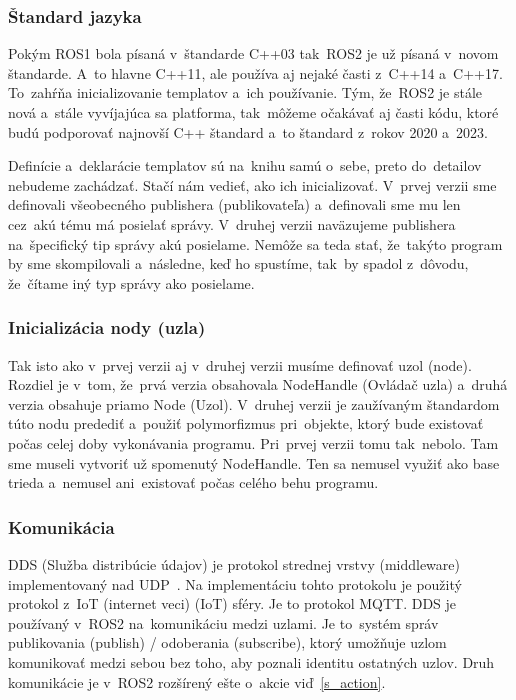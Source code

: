 \subsubsection{Štandard jazyka}

	Pokým ROS1 bola písaná v~štandarde C++03 tak~ROS2 je už písaná v~novom štandarde. A~to hlavne C++11, ale používa aj nejaké časti z~C++14
	a~C++17. To~zahŕňa inicializovanie templatov a~ich používanie. Tým, že~ROS2 je stále nová a~stále vyvíjajúca sa platforma, tak~môžeme očakávať aj časti
	kódu, ktoré budú podporovať najnovší C++ štandard a~to štandard z~rokov 2020 a~2023.

	Definície a~deklarácie templatov sú na~knihu samú o~sebe, preto do~detailov nebudeme zachádzať. Stačí nám vedieť, ako ich inicializovať.
	V~prvej verzii sme definovali všeobecného publishera (publikovateľa) a~definovali sme mu len cez~akú tému má posielať správy. V~druhej verzii
	naväzujeme publishera na~špecifický tip správy akú posielame. Nemôže sa teda stať, že~takýto program by sme skompilovali a~následne, keď
	ho spustíme, tak~by spadol z~dôvodu, že~čítame iný typ správy ako posielame.

\subsubsection{Inicializácia nody (uzla)}

	Tak isto ako v~prvej verzii aj v~druhej verzii musíme definovať uzol (node). Rozdiel je v~tom, že~prvá verzia obsahovala NodeHandle (Ovládač uzla)
	a~druhá verzia obsahuje priamo Node (Uzol). V~druhej verzii je zaužívaným štandardom túto nodu predediť a~použiť polymorfizmus pri~objekte,
	ktorý bude existovať počas celej doby vykonávania programu. Pri~prvej verzii tomu tak~nebolo. Tam sme museli vytvoriť už spomenutý NodeHandle.
	Ten sa nemusel využiť ako base trieda a~nemusel ani~existovať počas celého behu programu.

\subsubsection{Komunikácia}

	DDS (Služba distribúcie údajov) je protokol strednej vrstvy (middleware) implementovaný nad UDP~\cite{ROS2book}. Na implementáciu tohto protokolu
	je použitý protokol z~IoT (internet veci) (\acrlong{IoT}) sféry. Je to protokol MQTT. DDS je používaný v~ROS2 na~komunikáciu medzi uzlami. Je
	to~systém správ publikovania (publish) / odoberania (subscribe), ktorý umožňuje uzlom komunikovať medzi sebou bez toho, aby poznali identitu
	ostatných uzlov. Druh komunikácie je v~ROS2 rozšírený ešte o~akcie viď~\ref{s_action}.

